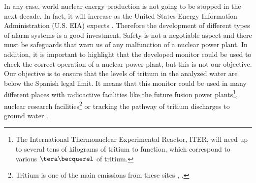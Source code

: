 In any case, world nuclear energy production is not going to be stopped in the next decade. In fact, it will increase as the United States Energy Information Administration (U.S. EIA) expects \cite{EIAOutlook}. Therefore the development of  different types of alarm systems is a good investment. Safety is not a negotiable aspect and there must be safeguards that warn us of any malfunction of a nuclear power plant. In addition, it is important to highlight that the developed monitor could be used to check the correct operation of a nuclear power plant, but this is not our objective. Our objective is to ensure that the levels of tritium in the analyzed water are below the Spanish legal limit. It means that this monitor could be used in many different places with radioactive facilities like the future fusion power plants\footnote{The International Thermonuclear Experimental Reactor, ITER, will need up to several tens of kilograms of tritium to function, which correspond to various $\tera\becquerel$ of tritium.}, nuclear research facilities\footnote{Tritium is one of the main emissions from these sites \cite{FERMILAB}, \cite{BrookHavenNationalLaboratory}.} or tracking the pathway of tritium discharges to ground water \cite{TrackingTritium}. 

